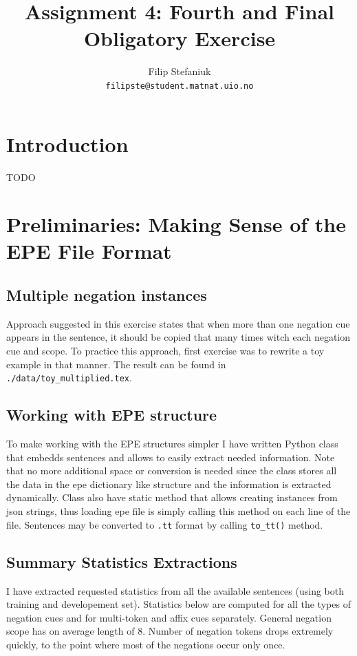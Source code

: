 \documentclass{article}
\title{Assignment 4: Fourth and Final Obligatory Exercise} %
\author{Filip Stefaniuk\\ \texttt{filipste@student.matnat.uio.no}} %
\begin{document}
\maketitle
\section{Introduction}
TODO
\section{Preliminaries: Making Sense of the EPE File Format}


\subsection{Multiple negation instances}
Approach suggested in this exercise states that when more than one negation
cue appears in the sentence, it should be copied that many times witch each
negation cue and scope. To practice this approach, first exercise was to rewrite
a toy example in that manner. The result can be found in \lstinline{./data/toy_multiplied.tex}.

\subsection{Working with EPE structure}
To make working with the EPE structures simpler I have written Python class that embedds
sentences and allows to easily extract needed information. Note that no more additional
space or conversion is needed since the class stores all the data in the epe dictionary like
structure and the information is extracted dynamically. Class also have static method that
allows creating instances from json strings, thus loading epe file is simply calling this method
on each line of the file. Sentences may be converted to \lstinline{.tt} format by calling
\lstinline{to_tt()} method.

\subsection{Summary Statistics Extractions}
I have extracted requested statistics from all the available sentences (using both
training and developement set). Statistics below are computed for all the types of negation
cues and for multi-token and affix cues separately. General negation scope has on average
length of $8$. Number of negation tokens drops extremely quickly, to the point where most of
the negations occur only once.
\end{document}
